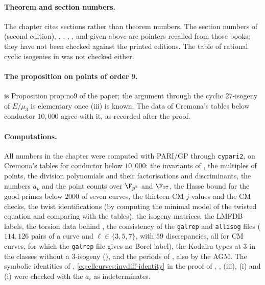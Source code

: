 \paragraph{Theorem and section numbers.} The chapter cites sections rather than theorem numbers. The section numbers of \cite{SilvermanAEC} (second edition), \cite{SilvermanATAEC},
\cite{WashingtonEC}, \cite{Cox}, \cite{Cohen93}, \cite{Cremona97} and \cite{DiamondShurman} given above are pointers recalled from those books; they have not been checked against the printed
editions. The table of rational cyclic isogenies in \cite{LozanoRobledo13} was not checked either.

\paragraph{The proposition on points of order $9$.}  is Proposition prop:no9 of the paper; the argument through the cyclic $27$-isogeny of $E/\mu_3$ is
elementary once (iii) is known. The data of Cremona's tables below conductor $10{,}000$ agree with it, as recorded after the proof.

\paragraph{Computations.} All numbers in the chapter were computed with PARI/GP \cite{PARI} through \texttt{cypari2}, on Cremona's tables \cite{ecdata} for conductor below $10{,}000$: the invariants
of , the multiples of points, the division polynomials and their factorisations and discriminants, the numbers $a_p$ and the point counts over $\F_{p^2}$ and
$\F_{27}$, the Hasse bound for the good primes below $2000$ of seven curves, the thirteen CM $j$-values and the CM checks, the twist identifications (by computing the minimal model of the twisted
equation and comparing with the tables), the isogeny matrices, the LMFDB labels, the torsion data behind , the consistency of the \texttt{galrep} and \texttt{allisog} files
($114{,}126$ pairs of a curve and $\ell\in\{3,5,7\}$, with $59$ discrepancies, all for CM curves, for which the \texttt{galrep} file gives no Borel label), the Kodaira types at $3$
in the classes without a $3$-isogeny (), and the periods of , also by the AGM. The symbolic identities of ,
\eqref{eq:ellcurves:invdiff-identity} in the proof of , , (iii), (i) and (i) were checked
with the $a_i$ as indeterminates.
